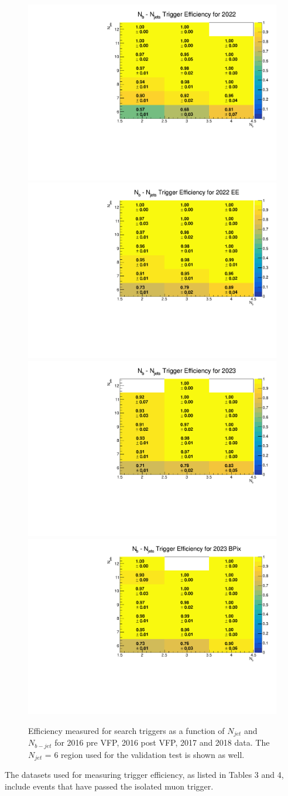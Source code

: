 \documentclass[twoside]{article}
\begin{document}
\begin{figure}[!t]
    \centering
    \includegraphics[width=.4\columnwidth]{plots/Trigger/2022.pdf}
    \includegraphics[width=.4\columnwidth]{plots/Trigger/2022EE.pdf}
    \includegraphics[width=.4\columnwidth]{plots/Trigger/2023.pdf}
    \includegraphics[width=.4\columnwidth]{plots/Trigger/2023BPix.pdf}
    
    \caption{Efficiency measured for search triggers as a function of $N_{jet}$ and $N_{b-jet}$ for 2016 pre VFP, 2016 post VFP, 2017 and 2018 data. The $N_{jet}$ = 6 region used for the validation test is shown as well.}
    \label{figure_1} 
\end{figure}
The datasets used for measuring trigger efficiency, as listed in Tables 3 and 4, include events that have passed the isolated muon trigger.
\end{document}
